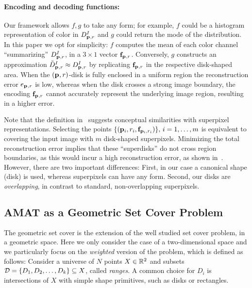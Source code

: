 \documentclass[10pt,twocolumn,letterpaper]{article}
\begin{document}
\paragraph{Encoding and decoding functions:}
Our framework allows $f,g$ to take any form; 
for example, $f$ could be a histogram representation of color in $D_{\mathbf{p}_{},r}^I$ and $g$ could return the mode of the distribution.
In this paper we opt for simplicity:
$f$ computes the mean of each color channel ``summarizing'' $D_{\mathbf{p}_{},r}^I$, in a $3\times1$ vector $\mathbf{f}_{\mathbf{p}_{},r}$.
Conversely, $g$ constructs an approximation $\tilde{D}_{\mathbf{p}_{},r}^I \approx D_{\mathbf{p}_{},r}^I$ by replicating $\mathbf{f}_{\mathbf{p}_{},r}$ in the
respective disk-shaped area.
When the $(\mathbf{p}_{},r)$-disk is fully enclosed in a uniform region the reconstruction error $e_{\mathbf{p}_{},r}$
is low, whereas when the disk crosses a strong image boundary, the encoding $\mathbf{f}_{\mathbf{p}_{},r}$ cannot accurately represent
the underlying image region, resulting in a higher error. 

Note that the definition in~ suggests conceptual similarities with superpixel representations.
Selecting the points $\{ (\mathbf{p}_{i},r_i,\mathbf{f}_{\mathbf{p}_{i},r_i}) \},\,i=1,\ldots,m$ is equivalent to covering the input image
with $m$ disk-shaped superpixels. Minimizing the total reconstruction error implies that these ``superdisks'' do not
cross region boundaries, as this would incur a high reconstruction error, as shown in~.
However, there are two important differences:
First, in our case a canonical shape (disk) is used, whereas superpixels can have any form. 
Second, our disks are \emph{overlapping}, in contrast to standard, non-overlapping superpixels.

\subsection{AMAT as a Geometric Set Cover Problem}\label{sec:method:wgsc}
The geometric set cover is the extension of the well studied set cover problem, in a geometric space.
Here we only consider the case of a two-dimensional space and we particularly focus on the 
\emph{weighted} version of the problem, which is defined as follows:
Consider a universe of $N$ points $X \in \mathbb{R}^2$ and subsets
$\mathcal{D} = \{D_1,D_2,\ldots,D_k\} \subseteq X$, called \emph{ranges}. 
A common choice for $D_i$ is intersections of $X$ with simple shape primitives, such as disks or rectangles.
\end{document}
